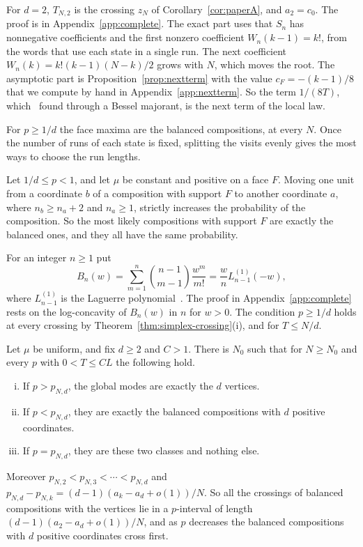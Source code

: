 For $d=2$, $T_{N,2}$ is the crossing $z_N$ of Corollary~\ref{cor:paperA}, and $a_2=c_0$.
The proof is in Appendix~\ref{app:complete}. The exact part uses that $S_n$ has nonnegative
coefficients and the first nonzero coefficient $W_n(k-1)=k!$, from the words that use each
state in a single run. The next coefficient $W_n(k)=k!(k-1)(N-k)/2$ grows with $N$, which moves
the root. The asymptotic part is Proposition~\ref{prop:nextterm} with the value
$c_F=-(k-1)/8$ that we compute by hand in Appendix~\ref{app:nextterm}. So the term $1/(8T)$,
which~\cite{paperB} found through a Bessel majorant, is the next term of the local law.

For $p\ge1/d$ the face maxima are the balanced compositions, at every $N$. Once the number of runs of each state is
fixed, splitting the visits evenly gives the most ways to choose the run lengths.

\begin{theorem}\label{thm:simplex-balance}
Let $1/d\le p<1$, and let $\mu$ be constant and positive on a face $F$. Moving one unit from a
coordinate $b$ of a composition with support $F$ to another coordinate $a$, where $n_b\ge n_a+2$ and
$n_a\ge1$, strictly increases the probability of the composition. So the most likely compositions with support
$F$ are exactly the balanced ones, and they all have the same probability.
\end{theorem}

For an integer $n\ge1$ put
\begin{equation}\label{eq:refresh-polynomial}
B_n(w)=\sum_{m=1}^n\binom{n-1}{m-1}\frac{w^m}{m!}
=\frac wn L^{(1)}_{n-1}(-w),
\end{equation}
where $L^{(1)}_{n-1}$ is the Laguerre polynomial~\cite[Eq.~18.5.12]{dlmf}.
The proof in Appendix~\ref{app:complete} rests on the log-concavity of $B_n(w)$ in $n$ for
$w>0$. The condition $p\ge1/d$ holds at every crossing
by Theorem~\ref{thm:simplex-crossing}(i), and for $T\le N/d$.

\begin{corollary}\label{cor:simplex-modes}
Let $\mu$ be uniform, and fix $d\ge2$ and $C>1$. There is $N_0$ such that for $N\ge N_0$ and
every $p$ with $0<T\le CL$ the following hold.
\begin{enumerate}[(i)]
\item If $p>p_{N,d}$, the global modes are exactly the $d$ vertices.
\item If $p<p_{N,d}$, they are exactly the balanced compositions with $d$ positive
coordinates.
\item If $p=p_{N,d}$, they are these two classes and nothing else.
\end{enumerate}
Moreover $p_{N,2}<p_{N,3}<\cdots<p_{N,d}$ and
$p_{N,d}-p_{N,k}=(d-1)(a_k-a_d+o(1))/N$. So all the crossings of balanced compositions with the
vertices lie in a $p$-interval of length $(d-1)(a_2-a_d+o(1))/N$, and as $p$ decreases the
balanced compositions with $d$ positive coordinates cross first.
\end{corollary}

